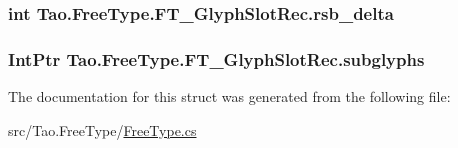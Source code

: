 \label{struct_tao_1_1_free_type_1_1_f_t___glyph_slot_rec_aae035de7a8c6bcdf407a2b45c163dcf8}
\hypertarget{struct_tao_1_1_free_type_1_1_f_t___glyph_slot_rec_ad119b509552f357b2cdc777a4ec4bc23}{
\subsubsection[{rsb\_\-delta}]{\setlength{\rightskip}{0pt plus 5cm}int {\bf Tao.FreeType.FT\_\-GlyphSlotRec.rsb\_\-delta}}}
\label{struct_tao_1_1_free_type_1_1_f_t___glyph_slot_rec_ad119b509552f357b2cdc777a4ec4bc23}
\hypertarget{struct_tao_1_1_free_type_1_1_f_t___glyph_slot_rec_affc78523d60cf49592bd61747ce4c13a}{
\subsubsection[{subglyphs}]{\setlength{\rightskip}{0pt plus 5cm}IntPtr {\bf Tao.FreeType.FT\_\-GlyphSlotRec.subglyphs}}}
\label{struct_tao_1_1_free_type_1_1_f_t___glyph_slot_rec_affc78523d60cf49592bd61747ce4c13a}


The documentation for this struct was generated from the following file:\begin{DoxyCompactItemize}
\item 
src/Tao.FreeType/\hyperlink{_free_type_8cs}{FreeType.cs}\end{DoxyCompactItemize}
